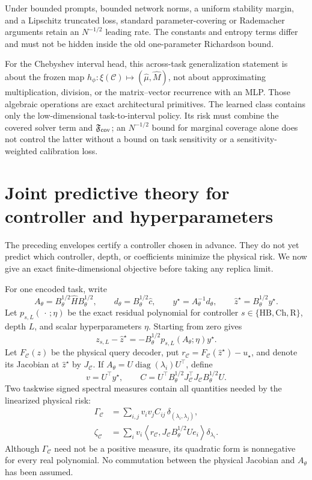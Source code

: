 \documentclass[11pt]{article}
\begin{document}
Under bounded prompts, bounded network norms, a uniform stability margin, and
a Lipschitz truncated loss, standard parameter-covering or Rademacher arguments
retain an $N^{-1/2}$ leading rate.  The constants and entropy terms differ and
must not be hidden inside the old one-parameter Richardson bound.

For the Chebyshev interval head, this across-task generalization statement is
about the frozen map $h_\phi:\xi(\mathcal C)\mapsto
(\widehat\mu,\widehat M)$, not about approximating multiplication, division,
or the matrix--vector recurrence with an MLP.  Those algebraic operations are
exact architectural primitives.  The learned class contains only the
low-dimensional task-to-interval policy.  Its risk must combine the covered
solver term and $\mathfrak F_{\rm cov}$; an $N^{-1/2}$ bound for marginal
coverage alone does not control the latter without a bound on task
sensitivity or a sensitivity-weighted calibration loss.

\section{Joint predictive theory for controller and hyperparameters}
\label{sec:joint-predictive}

The preceding envelopes certify a controller chosen in advance.  They do not
yet predict which controller, depth, or coefficients minimize the physical
risk.  We now give an exact finite-dimensional objective before taking any
replica limit.

For one encoded task, write
\[
 A_\theta=B_\theta^{1/2}\widehat H B_\theta^{1/2},
 \qquad d_\theta=B_\theta^{1/2}\widehat c,
 \qquad y^\star=A_\theta^{-1}d_\theta,
 \qquad \widehat z^\star=B_\theta^{1/2}y^\star.
\]
Let $p_{s,L}(\,\cdot\,;\eta)$ be the exact residual polynomial for controller
$s\in\{\mathrm{HB},\mathrm{Ch},\mathrm{R}\}$, depth $L$, and scalar
hyperparameters $\eta$.  Starting from zero gives
\[
 z_{s,L}-\widehat z^\star
 =-B_\theta^{1/2}p_{s,L}(A_\theta;\eta)y^\star.
\]
Let $F_{\mathcal C}(z)$ be the physical query decoder, put
$r_{\mathcal C}=F_{\mathcal C}(\widehat z^\star)-u_\star$, and denote its
Jacobian at $\widehat z^\star$ by $J_{\mathcal C}$.  If
$A_\theta=U\operatorname{diag}(\lambda_i)U^\top$, define
\[
 v=U^\top y^\star,
 \qquad
 C=U^\top B_\theta^{1/2}J_{\mathcal C}^\top J_{\mathcal C}
 B_\theta^{1/2}U.
\]
Two taskwise signed spectral measures contain all quantities needed by the
linearized physical risk:
\begin{align*}
 \Gamma_{\mathcal C}
 &=\sum_{i,j}v_i v_j C_{ij}\,
 \delta_{(\lambda_i,\lambda_j)},\\
 \zeta_{\mathcal C}
 &=\sum_i v_i
 \left\langle r_{\mathcal C},
 J_{\mathcal C}B_\theta^{1/2}Ue_i\right\rangle
 \delta_{\lambda_i}.
\end{align*}
Although $\Gamma_{\mathcal C}$ need not be a positive measure, its quadratic
form is nonnegative for every real polynomial.  No commutation between the
physical Jacobian and $A_\theta$ has been assumed.
\end{document}
